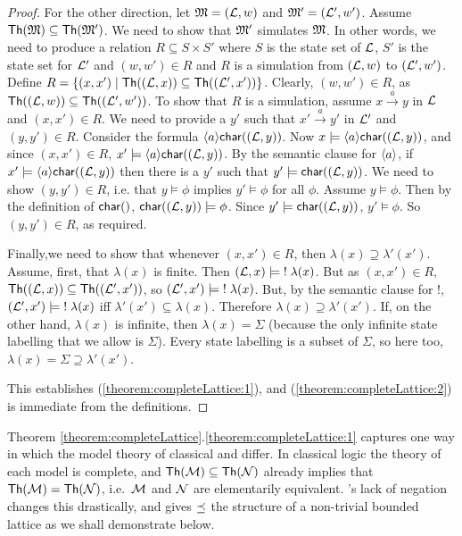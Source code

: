 \begin{proof}
For the other direction, let $\frak{M} = (\mathcal{L}, w)$ and $\frak{M}' = (\mathcal{L}',
w')$.  Assume $\mathsf{Th}(\frak{M}) \subseteq \mathsf{Th}(\frak{M}') $. We need to
show that $\frak{M}'$ simulates $\frak{M}$.  In other words, we need to
produce a relation $R \subseteq S \times S'$ where $S$ is the state
set of $\mathcal{L}$, $S'$ is the state set for $\mathcal{L}'$ and $(w,w') \in R$
and $R$ is a simulation from $(\mathcal{L}, w)$ to $ (\mathcal{L}', w')$.  Define $R
= \{(x,x') \; | \; \mathsf{Th}( (\mathcal{L}, x)) \subseteq \mathsf{Th}( (\mathcal{L}',
  x'))\}$.  Clearly, $(w,w') \in R$, as $\mathsf{Th}((\mathcal{L}, w)) \subseteq
\mathsf{Th}((\mathcal{L}', w')) $.  To show that $R$ is a simulation, assume $x
\xrightarrow{a} y$ in $\mathcal{L}$ and $(x,x') \in R$. 
We need to provide a
$y'$ such that $x' \xrightarrow{a} y'$ in $\mathcal{L}'$ and $(y,y') \in R$.  
Consider the formula $\langle a \rangle \mathsf{char}((\mathcal{L}, y))$. 
Now $x \models \langle a \rangle \mathsf{char}((\mathcal{L}, y))$, and since $(x,x') \in R$, $x' \models \langle a \rangle \mathsf{char}((\mathcal{L}, y))$.
By the semantic clause for $\MAY{a}$, if $x' \models \langle a \rangle \mathsf{char}((\mathcal{L}, y))$ then there is a $y'$ such that 
$y' \models \mathsf{char}((\mathcal{L}, y))$.
We need to show $(y,y') \in R$, i.e. that $y \models \phi$ implies $y' \models \phi$ for all $\phi$.
Assume $y \models \phi$. 
Then by the definition of $\CHAR$, $\mathsf{char}((\mathcal{L}, y)) \models \phi$.
Since $y' \models \mathsf{char}((\mathcal{L}, y))$, $y' \models \phi$. 
So $(y,y') \in R$, as required.

Finally,we need to show that whenever $(x,x') \in R$, then $\lambda(x)
\supseteq \lambda'(x')$.  Assume, first, that $\lambda(x)$ is finite.
Then $(\mathcal{L}, x) \models \; ! \; \lambda(x)$.  But as $(x,x') \in R$,
$\mathsf{Th}((\mathcal{L}, x)) \subseteq \mathsf{Th}((\mathcal{L}', x')) $, so $(\mathcal{L}', x')
\models \; ! \; \lambda(x)$.  But, by the semantic clause for $!$,
$(\mathcal{L}', x') \models \; ! \; \lambda(x)$ iff $\lambda'(x') \subseteq
\lambda(x)$.  Therefore $\lambda(x) \supseteq \lambda'(x')$.  If, on
the other hand, $\lambda(x)$ is infinite, then $\lambda(x) = \Sigma$
(because the only infinite state labelling that we allow is
$\Sigma$). Every state labelling is a subset of $\Sigma$, so here too,
$\lambda(x) = \Sigma \supseteq \lambda'(x')$.  

This establishes (\ref{theorem:completeLattice:1}), and
(\ref{theorem:completeLattice:2}) is immediate from the definitions.


\end{proof}

\NI Theorem
\ref{theorem:completeLattice}.\ref{theorem:completeLattice:1}
captures one way in which the model theory of
classical and \cathoristic{} differ. In classical logic the theory of
each model is complete, and $\mathsf{Th}(\mathcal{M}) \subseteq
\mathsf{Th}(\mathcal{N})$ already implies that $\mathsf{Th}(\mathcal{M}) =
\mathsf{Th}(\mathcal{N})$, i.e.~$\mathcal{M}$ and $\mathcal{N}$ are elementarily
equivalent. \Cathoristic{}'s lack of negation changes this drastically, and
gives $\preceq$ the structure of a non-trivial bounded lattice as we
shall demonstrate below.

